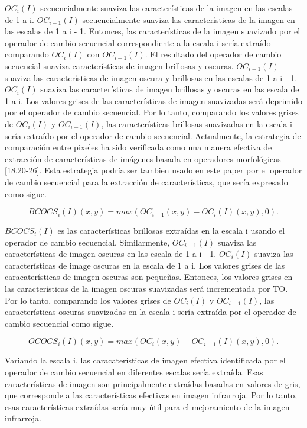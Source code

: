 \documentclass[a4paper, 11 pt, conference]{ieeeconf}      %
\begin{document}
$OC_i(I)$ secuencialmente suaviza las caracter\'isticas de la imagen en las escalas de 1 a i. $OC_{i-1}(I)$ secuencialmente suaviza las caracter\'isticas de la imagen en las escalas de 1 a i - 1. Entonces, las caracter\'isticas de la imagen suavizado por el operador de cambio secuencial correspondiente a la escala i ser\'ia extra\'ido comparando $OC_i(I) $ con $OC_{i-1}(I)$.
El resultado del operador de cambio secuencial suaviza caracter\'isticas de imagen brillosas y oscuras. $OC_{i-1}(I)$ suaviza las caracter\'isticas de imagen oscura y brillosas en las escalas de 1 a i - 1. $OC_i(I)$ suaviza las caracter\'isticas de imagen brillosas y oscuras en las escala de 1 a i. Los valores grises de las caracter\'isticas de imagen suavizadas ser\'a deprimido por el operador de cambio secuencial. Por lo tanto, comparando los valores grises de $OC_i(I)$ y $OC_{i-1}(I)$, las caracter\'isticas brillosas suavizadas en la escala i ser\'ia extra\'ido por el operador de cambio secuencial. Actualmente, la estrategia de comparaci\'on entre pixeles ha sido verificada como una manera efectiva de extracci\'on de caracter\'isticas de im\'agenes basada en operadores morfol\'ogicas [18,20-26]. Esta estrategia podr\'ia ser tambien usado en este paper por el operador de cambio secuencial para la extracci\'on de caracter\'isticas, que ser\'ia expresado como sigue.
\begin{small}


$$
BCOCS_i(I)(x,y) = max(OC_{i-1}(x,y) - OC_i(I)(x,y),0).
$$

\end{small}
$BCOCS_i(I)$ es las caracter\'isticas brillosas extra\'idas en la escala i usando el operador de cambio secuencial.
Similarmente, $OC_{i-1}(I) $ suaviza las caracter\'isticas de imagen oscuras en las escala de 1 a i - 1. $OC_i(I)$ suaviza las caracter\'isticas de image oscuras en la escala de 1 a i. Los valores grises de las caracater\'isticas de imagen oscuras son pequeñas. Entonces, los valores grises en las caracter\'isticas de la imagen oscuras suavizadas ser\'a incrementada por TO. Por lo tanto, comparando los valores grises de $OC_i(I)$ y $OC_{i-1}(I)$, las caracter\'isticas oscuras suavizadas en la escala i ser\'ia extra\'ida por el operador de cambio secuencial como sigue.

\begin{small}
$$
OCOCS_i(I)(x,y) = max(OC_i(x,y) - OC_{i-1}(I)(x,y),0).
$$

\end{small}

Variando la escala i, las caracater\'isticas de imagen efectiva identificada por el operador de cambio secuencial en diferentes escalas ser\'ia extra\'ida. Esas caracter\'isticas de imagen son principalmente extra\'idas basadas en valores de gris, que corresponde a las caracter\'isticas efectivas en imagen infrarroja. Por lo tanto, esas caracter\'isticas extra\'idas ser\'ia muy \'util para el mejoramiento de la imagen infrarroja.
\end{document}
